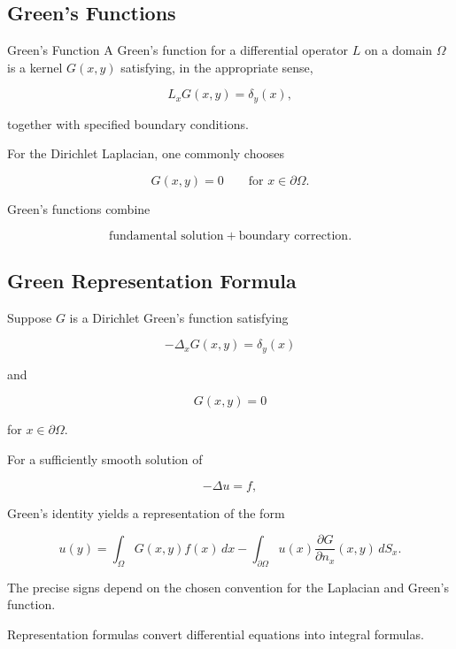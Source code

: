 \subsection{Green's Functions}
\label{subsec:potential-greens-functions}

\begin{definitionbox}{Green's Function}
A Green's function for a differential operator \(L\) on a domain
\(\Omega\) is a kernel \(G(x,y)\) satisfying, in the appropriate sense,

\[
\boxed{
L_xG(x,y)=\delta_y(x),
}
\]

together with specified boundary conditions.
\end{definitionbox}

For the Dirichlet Laplacian, one commonly chooses

\[
\boxed{
G(x,y)=0
\qquad
\text{for }x\in\partial\Omega.
}
\]

Green's functions combine

\[
\boxed{
\text{fundamental solution}
+
\text{boundary correction}.
}
\]

\subsection{Green Representation Formula}
\label{subsec:green-representation-formula}

Suppose \(G\) is a Dirichlet Green's function satisfying

\[
-\Delta_xG(x,y)=\delta_y(x)
\]

and

\[
G(x,y)=0
\]

for \(x\in\partial\Omega\).

For a sufficiently smooth solution of

\[
-\Delta u=f,
\]

Green's identity yields a representation of the form

\[
\boxed{
u(y)
=
\int_\Omega
G(x,y)f(x)\,dx
-
\int_{\partial\Omega}
u(x)
\frac{\partial G}{\partial n_x}(x,y)\,dS_x.
}
\]

The precise signs depend on the chosen convention for the Laplacian and
Green's function.

Representation formulas convert differential equations into integral
formulas.

